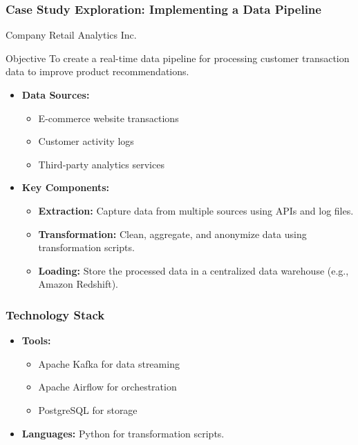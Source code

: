 \documentclass{beamer}
\begin{document}
\begin{frame}
    \frametitle{Case Study Exploration: Implementing a Data Pipeline}
    \begin{block}{Company}
        Retail Analytics Inc.
    \end{block}
    \begin{block}{Objective}
        To create a real-time data pipeline for processing customer transaction data to improve product recommendations.
    \end{block}
    \begin{itemize}
        \item \textbf{Data Sources:}
            \begin{itemize}
                \item E-commerce website transactions
                \item Customer activity logs
                \item Third-party analytics services
            \end{itemize}
        \item \textbf{Key Components:}
            \begin{itemize}
                \item \textbf{Extraction:} Capture data from multiple sources using APIs and log files.
                \item \textbf{Transformation:} Clean, aggregate, and anonymize data using transformation scripts.
                \item \textbf{Loading:} Store the processed data in a centralized data warehouse (e.g., Amazon Redshift).
            \end{itemize}
    \end{itemize}
\end{frame}

\begin{frame}
    \frametitle{Technology Stack}
    \begin{itemize}
        \item \textbf{Tools:}
            \begin{itemize}
                \item Apache Kafka for data streaming
                \item Apache Airflow for orchestration
                \item PostgreSQL for storage
            \end{itemize}
        \item \textbf{Languages:} Python for transformation scripts.
    \end{itemize}
\end{frame}
\end{document}
